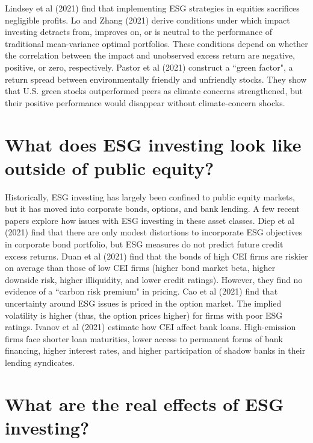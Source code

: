 \documentclass{article}
\begin{document}
Lindsey et al (2021) find that implementing ESG strategies in equities sacrifices negligible profits.  Lo and Zhang (2021) derive conditions under which impact investing detracts from, improves on, or is neutral to the performance of traditional mean-variance optimal portfolios.  These conditions depend on whether the correlation between the impact and unobserved excess return are negative, positive, or zero, respectively.  Pastor et al (2021) construct a ``green factor", a return spread between environmentally friendly and unfriendly stocks. They show that U.S. green stocks outperformed peers as climate concerns strengthened, but their positive performance would disappear without climate-concern shocks.


\section{What does ESG investing look like outside of public equity?}

Historically, ESG investing has largely been confined to public equity markets, but it has moved into corporate bonds, options, and bank lending. A few recent papers explore how issues with ESG investing in these asset classes.  Diep et al (2021) find that there are only modest distortions to incorporate ESG objectives in corporate bond portfolio, but ESG measures do not predict future credit excess returns.  Duan et al (2021) find that the bonds of high CEI firms are riskier on average than those of low CEI firms (higher bond market beta, higher downside risk, higher illiquidity, and lower credit ratings). However, they find no evidence of a ``carbon risk premium" in pricing. Cao et al (2021) find that uncertainty around ESG issues is priced in the option market.  The implied volatility is higher (thus, the option prices higher) for firms with poor ESG ratings.  Ivanov et al (2021) estimate how CEI affect bank loans.  High-emission firms face shorter loan maturities, lower access to permanent forms of bank financing, higher interest rates, and higher participation of shadow banks in their lending syndicates.


\pagebreak

\section{What are the real effects of ESG investing?}
\end{document}
